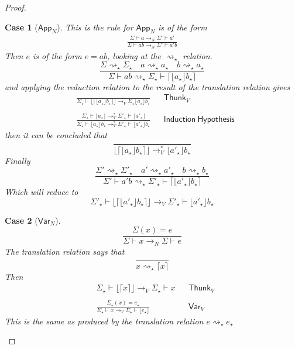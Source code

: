 \documentclass[float=false, crop=false]{standalone}
\newtheorem{case}{Case}
\numberwithin{subcase}{case}
\newcommand{\tlang}{\star}
\newcommand{\thunk}[1]{\lceil #1 \rceil}
\newcommand{\unwrap}[1]{\lfloor #1 \rfloor}
\newcommand{\tcbn}{\rightarrow_N}
\newcommand{\tcbv}{\rightarrow_V}
\newcommand{\tccbv}{\rightarrow_V^*}
\newcommand{\tlthunk}{\rightsquigarrow_\tlang}
\begin{document}
\begin{proof}
  \begin{case}[$\mathsf{App}_N$]
    This is the rule for $\textsf{App}_N$ is of the form
    \begin{align*}
      \frac{\Sigma \vdash a \tcbn \Sigma' \vdash a'}
      {\Sigma \vdash ab \tcbn \Sigma' \vdash a' b} 
    \end{align*}
    Then $e$ is of the form $e = a b$, looking at the $\tlthunk$ relation.
    \[\frac{\Sigma \tlthunk \Sigma_\tlang \quad a 
        \tlthunk a_\tlang \quad b \tlthunk a_\tlang}
      { \Sigma \vdash a b\tlthunk \Sigma_\tlang \vdash 
        \thunk{\unwrap{a_\tlang }b_\tlang}}\]
    and applying the reduction relation to the result of the translation 
    relation gives
    \begin{align*}
      &\frac{}{\Sigma_\tlang \vdash \unwrap{\thunk{\unwrap{a_\tlang} b_\tlang} }  
        \tcbv \Sigma_\tlang  \unwrap{a_\tlang} b_\tlang} && \mathsf{Thunk}_V\\ \\
      &\frac{\Sigma_\tlang \vdash \unwrap{a_\tlang} \tccbv \Sigma'_\tlang \vdash \unwrap{a'_\tlang}}{
      \Sigma_\tlang \vdash \unwrap{a_\tlang} b_\tlang \tccbv \Sigma'_\tlang \vdash 
      \unwrap{a'_\tlang} b_\tlang } &&
      \mathsf{Induction\ Hypothesis}
    \end{align*}
    then it can be concluded that 
    \[ \frac{}{\unwrap{\thunk{\unwrap{a_\tlang} b_\tlang}} \tccbv 
            \unwrap{a'_\tlang} b_\tlang  } \]
    Finally \[ \frac{\Sigma' \tlthunk \Sigma'_\tlang \quad a' \tlthunk a'_\tlang \quad b \tlthunk b_\tlang}
      {\Sigma' \vdash a' b \tlthunk \Sigma'_\tlang \vdash \thunk{\unwrap{a'_\tlang} b_\tlang} } \]
    Which will reduce to
    \[\Sigma'_\tlang \vdash \unwrap{\thunk{\unwrap{a'_\tlang}b_\tlang}} \tcbv \Sigma'_\tlang \vdash
    \unwrap {a'_\tlang} b_\tlang\]

  \end{case}

  \begin{case}[$\mathsf{Var}_N$]
    \[ \frac{\Sigma(x) = e}{\Sigma \vdash x \tcbn \Sigma \vdash e}  \]
    The translation relation says that \[ \frac{}{x \tlthunk \thunk{x}} \]
    Then 
    \begin{align*}
    & \Sigma_\tlang \vdash \unwrap{\thunk{x}} \tcbv \Sigma_\tlang \vdash x  && \mathsf{Thunk}_V \\ \\
    & \frac{\Sigma_\tlang(x) = e_\tlang}
    {\Sigma_\tlang \vdash x  \tcbv \Sigma_\tlang \vdash \unwrap{e_\tlang}} && \mathsf{Var}_V 
  \end{align*}
    This is the same as produced by the translation relation 
    \mbox{$e \tlthunk e_\tlang$}
  \end{case}


\end{proof}
\end{document}
